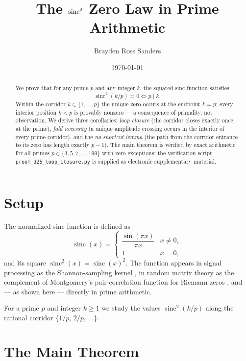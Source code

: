 \documentclass[11pt,reqno]{amsart}
\title[The sinc\texorpdfstring{$^2$}{\^{}2} zero law]{The \texorpdfstring{$\sinc^2$}{sinc\^{}2} Zero Law in Prime Arithmetic}
\author{Brayden Ross Sanders}
\date{\today}
\theoremstyle{plain}
\theoremstyle{remark}
\DeclareMathOperator{\sinc}{sinc}
\begin{document}
\begin{abstract}
We prove that for any prime $p$ and any integer $k$, the squared
sinc function satisfies
\[
  \sinc^2(k/p)=0 \iff p\mid k.
\]
Within the corridor $k\in\{1,\dots,p\}$ the unique zero occurs at
the endpoint $k=p$; every interior position $k<p$ is provably
nonzero --- a consequence of primality, not observation. We derive
three corollaries: \emph{loop closure} (the corridor closes exactly
once, at the prime), \emph{fold necessity} (a unique amplitude
crossing occurs in the interior of every prime corridor), and the
\emph{no-shortcut lemma} (the path from the corridor entrance to its
zero has length exactly $p-1$). The main theorem is verified by
exact arithmetic for all primes $p\in\{3,5,7,\dots,199\}$ with zero
exceptions; the verification script
\texttt{proof\_d25\_loop\_closure.py} is supplied as electronic
supplementary material.
\end{abstract}

\maketitle

\section{Setup}\label{sec:setup}

The normalized sinc function is defined as
\begin{equation}\label{eq:sinc-def}
  \sinc(x)=
  \begin{cases}
     \dfrac{\sin(\pi x)}{\pi x} & x\neq 0,\\[4pt]
     1 & x=0,
  \end{cases}
\end{equation}
and its square $\sinc^2(x)=\sinc(x)^2$. The function appears in
signal processing as the Shannon-sampling kernel
\cite{Shannon1949}, in random matrix theory as the complement of
Montgomery's pair-correlation function for Riemann zeros
\cite{Montgomery1973}, and --- as shown here --- directly in prime
arithmetic.

For a prime $p$ and integer $k\ge 1$ we study the values
$\sinc^2(k/p)$ along the rational corridor
$\{1/p,\,2/p,\,\dots\}$.

\section{The Main Theorem}\label{sec:main}
\end{document}
